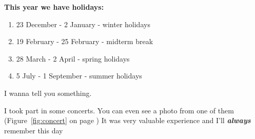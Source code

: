 \textbf{\large This year we have holidays:}
\begin{enumerate}
    \item 23 December - 2 January - winter holidays
    \item 19 February - 25 February - midterm break
    \item 28 March - 2 April - spring holidays
    \item 5 July - 1 September - summer holidays
\end{enumerate}

\begin{center}
    {\large I wanna tell you something.}
    
    I took part in some concerts. You can even see a photo from one of them (Figure~\ref{fig:concert} on page \pageref{fig:concert}) It was very valuable experience and I'll \textbf{\emph{always}} remember this day \par 
    
\end{center}
    